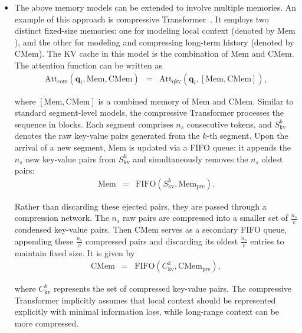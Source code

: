 \begin{itemize}
\item \vspace{0.3em} The above memory models can be extended to involve multiple memories. An example of this approach is compressive Transformer~\cite{rae-etal:2020:compressive}. It employs two distinct fixed-size memories: one for modeling local context (denoted by $\mathrm{Mem}$), and the other for modeling and compressing long-term history (denoted by $\mathrm{CMem}$). The KV cache in this model is the combination of $\mathrm{Mem}$ and $\mathrm{CMem}$. The attention function can be written as
    \begin{eqnarray}
    \mathrm{Att}_{\mathrm{com}}(\mathbf{q}_i,\mathrm{Mem},\mathrm{CMem}) & = & \mathrm{Att}_{\mathrm{qkv}}(\mathbf{q}_i, [\mathrm{Mem},\mathrm{CMem}]),
    \end{eqnarray}

    \noindent where $[\mathrm{Mem},\mathrm{CMem}]$ is a combined memory of $\mathrm{Mem}$ and $\mathrm{CMem}$. Similar to standard segment-level models, the compressive Transformer processes the sequence in blocks. Each segment comprises $n_s$ consecutive tokens, and $S_{\mathrm{kv}}^{k}$ denotes the raw key-value pairs generated from the $k$-th segment. Upon the arrival of a new segment, $\mathrm{Mem}$ is updated via a FIFO queue: it appends the $n_s$ new key-value pairs from $S_{\mathrm{kv}}^{k}$ and simultaneously removes the $n_s$ oldest pairs:
    \begin{eqnarray}
    \mathrm{Mem} & = & \mathrm{FIFO}(S_{\mathrm{kv}}^{k}, \mathrm{Mem}_{\mathrm{pre}}).
    \end{eqnarray}

    \noindent Rather than discarding these ejected pairs, they are passed through a compression network. The $n_s$ raw pairs are compressed into a smaller set of $\frac{n_s}{c}$ condensed key-value pairs. Then $\mathrm{CMem}$ serves as a secondary FIFO queue, appending these $\frac{n_s}{c}$ compressed pairs and discarding its oldest $\frac{n_s}{c}$ entries to maintain fixed size. It is given by
    \begin{eqnarray}
    \mathrm{CMem}& = & \mathrm{FIFO}(C_{\mathrm{kv}}^{k}, \mathrm{CMem}_{\mathrm{pre}}),
    \end{eqnarray}

    \noindent where $C_{\mathrm{kv}}^{k}$ represents the set of compressed key-value pairs. The compressive Transformer implicitly assumes that local context should be represented explicitly with minimal  information loss, while long-range context can be more compressed.


\end{itemize}
